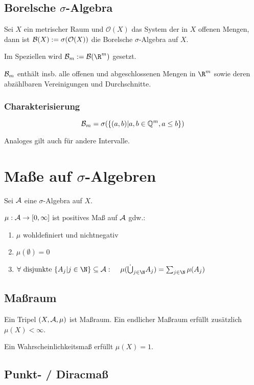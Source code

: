 \subsection*{Borelsche $\sigma$-Algebra}

Sei $X$ ein metrischer Raum und $\mathcal{O}(X)$ das System der in $X$ offenen Mengen, dann ist $\mathcal{B}(X) := \sigma(\mathcal{O}(X))$ die Borelsche $\sigma$-Algebra auf $X$.

Im Speziellen wird $\B_m := \B(\R^m)$ gesetzt.

$\mathcal{B}_m$ enthält insb. alle offenen und abgeschlossenen Mengen in $\R^m$ sowie deren abzählbaren Vereinigungen und Durchschnitte.

\subsubsection*{Charakterisierung}

\[ \mathcal{B}_m = \sigma(\{(a, b) | a, b \in \mathbb{Q}^m, a \leq b\}) \]

Analoges gilt auch für andere Intervalle.

\section*{Maße auf $\sigma$-Algebren}

Sei $\mathcal{A}$ eine $\sigma$-Algebra auf $X$.

$\mu : \mathcal{A} \to [0, \infty]$ ist positives Maß auf $\mathcal{A}$ gdw.:

\begin{enumerate}[label=(\alph*)]
	\item $\mu$ wohldefiniert und nichtnegativ
	\item $\mu(\emptyset) = 0$
	\item $\forall \text{ disjunkte } \{A_j | j \in \N\} \subseteq \A :\\ \hspace*{4mm} \mu(\dot\bigcup_{j\in \N} A_j) = \sum_{j\in \N} \mu(A_j)$
\end{enumerate}

\subsection*{Maßraum}

Ein Tripel $(X, \mathcal{A}, \mu)$ ist Maßraum. Ein endlicher Maßraum erfüllt zusätzlich $\mu(X) < \infty$.

Ein Wahrscheinlichkeitsmaß erfüllt $\mu(X) = 1$.

\subsection*{Punkt- / Diracmaß}

